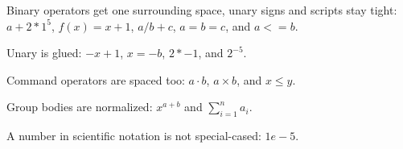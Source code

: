 Binary operators get one surrounding space, unary signs and scripts stay tight:
$a + 2 * 1^5$, $f(x) = x + 1$, $a / b + c$, $a = b = c$, and $a <= b$.

Unary is glued: $-x + 1$, $x = -b$, $2 * -1$, and $2^{-5}$.

Command operators are spaced too: $a \cdot b$, $a \times b$, and $x \leq y$.

Group bodies are normalized: $x^{a + b}$ and $\sum_{i = 1}^n a_i$.

A number in scientific notation is not special-cased: $1e - 5$.
